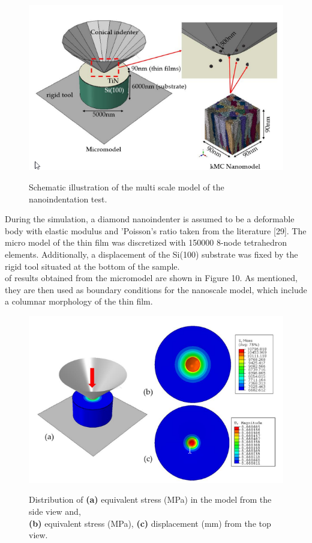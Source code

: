 \documentclass[journal,article,submit,pdftex,moreauthors]{Definitions/mdpi}
\begin{document}
\begin{figure}[H]
  \captionsetup{justification=centering}
  \centering
  \includegraphics[width=\linewidth]{Definitions/picture9.png}
  \label{fig:obraz9}
    \caption{Schematic illustration of the multi scale model of the nanoindentation test.}
\end{figure}  
 
During the simulation, a diamond nanoindenter is assumed to be a deformable body with elastic modulus and 'Poisson's ratio taken from the literature [29]. The micro model of the thin film was discretized with 150000 8-node tetrahedron elements. Additionally, a displacement of the Si(100) substrate was fixed by the rigid tool situated at the bottom of the sample.\\
 of results obtained from the micromodel are shown in Figure 10. As mentioned, they are then used as boundary conditions for the nanoscale model, which include a columnar morphology of the thin film.
 
\begin{figure}[H]
  \captionsetup{justification=centering}
  \centering
  \includegraphics[width=\linewidth]{Definitions/picture10.png}
  \label{fig:obraz10}
    \caption{Distribution of \textbf{(a)} equivalent stress (MPa) in the model from the side view and, \\\textbf{(b)} equivalent stress (MPa), \textbf{(c)} displacement (mm) from the top view.}
\end{figure}  
 
\end{document}
